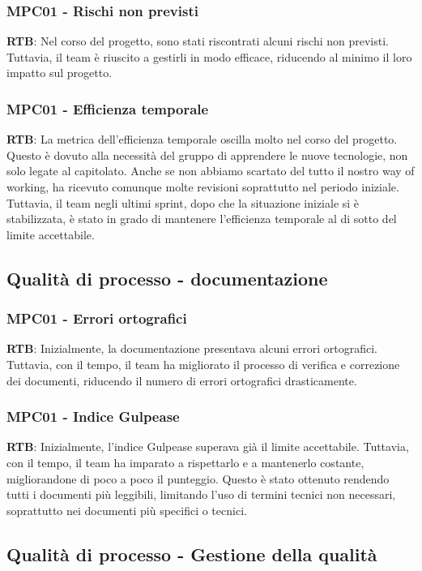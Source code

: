 \documentclass[10pt]{article}
\begin{document}
\begin{justify}
\subsubsection{MPC01 - Rischi non previsti}
\textbf{RTB}: Nel corso del progetto, sono stati riscontrati alcuni rischi non previsti. Tuttavia, il team è riuscito a gestirli in modo efficace, riducendo al minimo il loro impatto sul progetto.
\subsubsection{MPC01 - Efficienza temporale}
\textbf{RTB}: La metrica dell'efficienza temporale oscilla molto nel corso del progetto. Questo è dovuto alla necessità del gruppo di apprendere le nuove tecnologie, non solo legate al capitolato. Anche se non abbiamo scartato del tutto il nostro way of working, ha ricevuto comunque molte revisioni soprattutto nel periodo iniziale. Tuttavia, il team negli ultimi sprint, dopo che la situazione iniziale si è stabilizzata, è stato in grado di mantenere l'efficienza temporale al di sotto del limite accettabile.
\subsection{Qualità di processo - documentazione}
\subsubsection{MPC01 - Errori ortografici}
\textbf{RTB}: Inizialmente, la documentazione presentava alcuni errori ortografici. Tuttavia, con il tempo, il team ha migliorato il processo di verifica e correzione dei documenti, riducendo il numero di errori ortografici drasticamente.
\subsubsection{MPC01 - Indice Gulpease}
\textbf{RTB}: Inizialmente, l'indice Gulpease superava già il limite accettabile. Tuttavia, con il tempo, il team ha imparato a rispettarlo e a mantenerlo costante, migliorandone di poco a poco il punteggio. Questo è stato ottenuto rendendo tutti i documenti più leggibili, limitando l'uso di termini tecnici non necessari, soprattutto nei documenti più specifici o tecnici.
\subsection{Qualità di processo - Gestione della qualità}

\end{justify}
\end{document}
